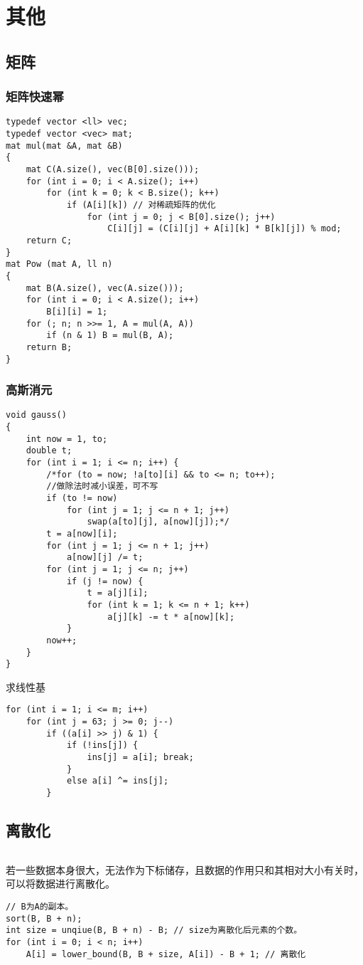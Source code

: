 \documentclass[a4]{article}
\begin{document}
\clearpage\section{其他}
\subsection{矩阵}
\subsubsection{矩阵快速幂}
\begin{lstlisting}
typedef vector <ll> vec;
typedef vector <vec> mat;
mat mul(mat &A, mat &B)
{
    mat C(A.size(), vec(B[0].size()));
    for (int i = 0; i < A.size(); i++)
        for (int k = 0; k < B.size(); k++)
            if (A[i][k]) // 对稀疏矩阵的优化
                for (int j = 0; j < B[0].size(); j++)
                    C[i][j] = (C[i][j] + A[i][k] * B[k][j]) % mod;
    return C;
}
mat Pow (mat A, ll n)
{
    mat B(A.size(), vec(A.size()));
    for (int i = 0; i < A.size(); i++)
        B[i][i] = 1;
    for (; n; n >>= 1, A = mul(A, A))
        if (n & 1) B = mul(B, A);
    return B;
}
\end{lstlisting}
\subsubsection{高斯消元}
\begin{lstlisting}
void gauss()
{
    int now = 1, to;
    double t;
    for (int i = 1; i <= n; i++) {
        /*for (to = now; !a[to][i] && to <= n; to++);
        //做除法时减小误差，可不写
        if (to != now)
            for (int j = 1; j <= n + 1; j++)
                swap(a[to][j], a[now][j]);*/
        t = a[now][i];
        for (int j = 1; j <= n + 1; j++)
            a[now][j] /= t;
        for (int j = 1; j <= n; j++)
            if (j != now) {
                t = a[j][i];
                for (int k = 1; k <= n + 1; k++)
                    a[j][k] -= t * a[now][k];
            }
        now++;
    }
}

\end{lstlisting}
求线性基
\begin{lstlisting}
for (int i = 1; i <= m; i++)
    for (int j = 63; j >= 0; j--)
        if ((a[i] >> j) & 1) {
            if (!ins[j]) {
                ins[j] = a[i]; break;
            }
            else a[i] ^= ins[j];
        }
\end{lstlisting}
\subsection{离散化}
\begin{lstlisting}
\end{lstlisting}
若一些数据本身很大，无法作为下标储存，且数据的作用只和其相对大小有关时，可以将数据进行离散化。
\begin{lstlisting}
// B为A的副本。
sort(B, B + n);
int size = unqiue(B, B + n) - B; // size为离散化后元素的个数。
for (int i = 0; i < n; i++)
    A[i] = lower_bound(B, B + size, A[i]) - B + 1; // 离散化
\end{lstlisting}
\end{document}
